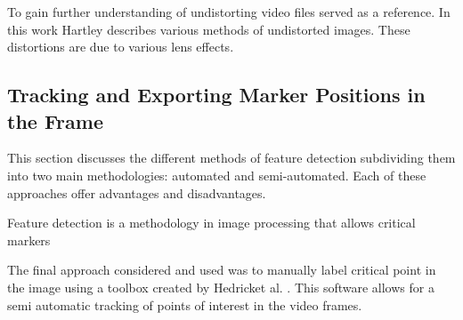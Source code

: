 To gain further understanding of undistorting video files \cite{Hartley2004} served as a reference. In this work Hartley describes various methods of undistorted images. These distortions are due to various lens effects.

\subsection{Tracking and Exporting Marker Positions in the Frame}

This section discusses the different methods of feature detection subdividing them into two main methodologies: automated and semi-automated. Each of these approaches offer advantages and disadvantages.

Feature detection is a methodology in image processing that allows critical markers 

The final approach considered and used was to manually label critical point in the image using a toolbox created by Hedricket al. \cite{hedrick2008software}. This software allows for a semi automatic tracking of points of interest in the video frames.












